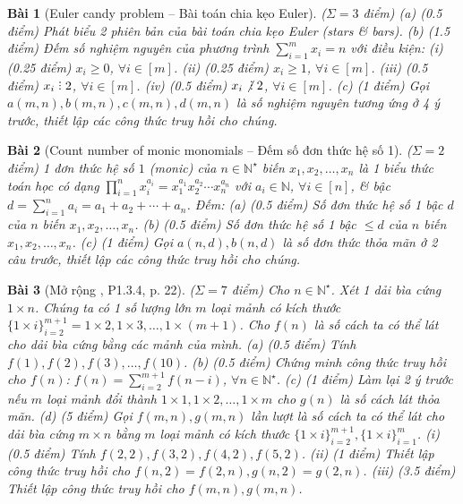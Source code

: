 \documentclass{article}
\newtheorem{baitoan}{Bài}
\DeclareRobustCommand{\divby}{%
    \mathrel{\vbox{\baselineskip.65ex\lineskiplimit0pt\hbox{.}\hbox{.}\hbox{.}}}%
}
\begin{document}
\begin{baitoan}[Euler candy problem -- Bài  toán chia kẹo Euler]
    {\rm($\Sigma = 3$ điểm)} (a) {\rm(0.5 điểm)} Phát biểu 2 phiên bản của bài toán chia kẹo Euler (stars \& bars). (b) {\rm(1.5 điểm)} Đếm số nghiệm nguyên của phương trình $\sum_{i=1}^m x_i = n$ với điều kiện: (i) {\rm(0.25 điểm)} $x_i\ge0$, $\forall i\in[m]$. (ii) {\rm(0.25 điểm)} $x_i\ge1$, $\forall i\in[m]$. (iii) {\rm(0.5 điểm)} $x_i\divby2$, $\forall i\in[m]$. (iv) {\rm(0.5 điểm)} $x_i\not{\divby2}$, $\forall i\in[m]$. (c) {\rm(1 điểm)} Gọi $a(m,n),b(m,n),c(m,n),d(m,n)$ là số nghiệm nguyên tương ứng ở 4 ý trước, thiết lập các công thức truy hồi cho chúng.
\end{baitoan}

\begin{baitoan}[Count number of monic monomials -- Đếm số đơn thức hệ số 1]
    {\rm($\Sigma = 2$ điểm)} 1 đơn thức hệ số $1$ (monic) của $n\in\mathbb{N}^\star$ biến $x_1,x_2,\ldots,x_n$ là 1 biểu thức toán học có dạng $\prod_{i=1}^n x_i^{a_i} = x_1^{a_1}x_2^{a_2}\cdots x_n^{a_n}$ với $a_i\in\mathbb{N}$, $\forall i\in[n]$, \& {\rm bậc} $d = \sum_{i=1}^n a_i = a_1 + a_2 + \cdots + a_n$. Đếm: (a) {\rm(0.5 điểm)} Số đơn thức hệ số 1 bậc $d$ của $n$ biến $x_1,x_2,\ldots,x_n$. (b) {\rm(0.5 điểm)} Số đơn thức hệ số 1 bậc $\le d$ của $n$ biến $x_1,x_2,\ldots,x_n$. (c) {\rm(1 điểm)} Gọi $a(n,d),b(n,d)$ là số đơn thức thỏa mãn ở 2 câu trước, thiết lập các công thức truy hồi cho chúng.
\end{baitoan}


\begin{baitoan}[Mở rộng \cite{Shahriari2022}, P1.3.4, p. 22]
    {\rm($\Sigma = 7$ điểm)} Cho $n\in\mathbb{N}^\star$. Xét 1 dải bìa cứng $1\times n$. Chúng ta có 1 số lượng lớn $m$ loại mảnh có kích thước $\{1\times i\}_{i=2}^{m+1} = 1\times2,1\times3,\ldots,1\times(m + 1)$. Cho $f(n)$ là số cách ta có thể lát cho dải bìa cứng bằng các mảnh của mình. (a) {\rm(0.5 điểm)} Tính $f(1),f(2),f(3),\ldots,f(10)$. (b) {\rm(0.5 điểm)} Chứng minh công thức truy hồi cho $f(n)$: $f(n) = \sum_{i=2}^{m + 1} f(n - i)$, $\forall n\in\mathbb{N}^\star$. (c) {\rm(1 điểm)} Làm lại 2 ý trước nếu $m$ loại mảnh đổi thành $1\times1,1\times2,\ldots,1\times m$ cho $g(n)$ là số cách lát thỏa mãn. (d) {\rm(5 điểm)} Gọi $f(m,n),g(m,n)$ lần lượt là số cách ta có thể lát cho dải bìa cứng $m\times n$ bằng $m$ loại mảnh có kích thước $\{1\times i\}_{i=2}^{m+1},\{1\times i\}_{i=1}^m$. (i) {\rm(0.5 điểm)} Tính $f(2,2),f(3,2),f(4,2),f(5,2)$. (ii) {\rm(1 điểm)} Thiết lập công thức truy hồi cho $f(n,2) = f(2,n),g(n,2) = g(2,n)$. (iii) {\rm(3.5 điểm)} Thiết lập công thức truy hồi cho $f(m,n),g(m,n)$.
\end{baitoan}
\end{document}
